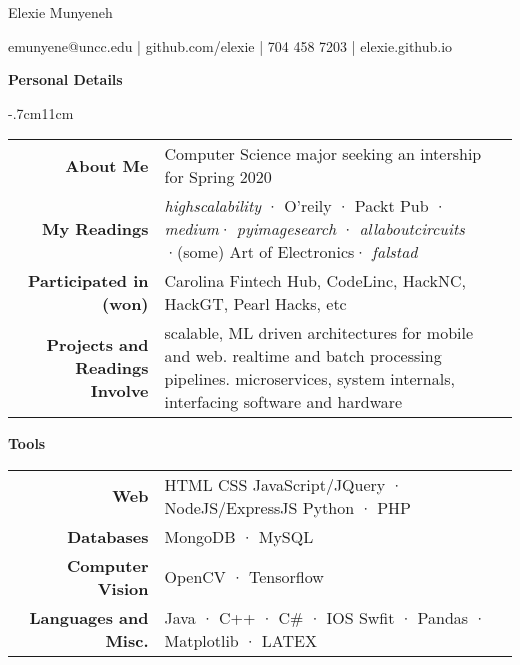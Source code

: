 \documentclass[12pt]{extarticle}
\begin{document}
\begin{center} 
 {\huge Elexie Munyeneh}
	\begin{center} 
		emunyene@uncc.edu |  github.com/elexie  | 704 458 7203 | elexie.github.io
	\end{center}
\end{center} 

	
\begin{flushleft}	
 \textbf{ Personal Details} %
 \end{flushleft}
 
\begin{flushleft}
\begin {adjustwidth}{-.7cm}{11cm}
\begin{tabularx}{\textwidth}{ r p{11cm} }
\small
   \textbf{About Me}     & Computer Science major seeking an intership for Spring 2020    \\ %
 \addlinespace[0.25cm]
 \small
   \textbf{My Readings }    & \emph{highscalability} · O'reily · Packt Pub · \emph{medium}· \emph{pyimagesearch} · \emph{allaboutcircuits} ·(some) Art of Electronics·  \emph{falstad} \\ 
      \addlinespace[0.25cm]
\small    
\textbf{Participated in  (won)}    & Carolina Fintech Hub, CodeLinc, HackNC, HackGT, Pearl Hacks, etc   \\ 
   \addlinespace[0.25cm]
  \small
 \textbf{Projects  and Readings Involve }         & scalable, ML driven architectures for mobile and web. realtime and batch processing pipelines. microservices, system internals, interfacing software and hardware         \\ %
 \end{tabularx}
 \end{adjustwidth}   	
\end{flushleft}	
 
 \begin{flushleft}
 \textbf{ Tools} %

 \begin{adjustwidth}{1.2cm}{-1cm}
\begin{tabularx}{\textwidth}{ r  p{11cm} }
\small
   \textbf{Web}     &  HTML CSS JavaScript/JQuery  · NodeJS/ExpressJS  Python · PHP      \\ %
   \addlinespace[0.25cm]
\small   
   \textbf{Databases}         & MongoDB · MySQL           \\ %
   \addlinespace[0.25cm]
\small   
   \textbf{Computer Vision}    & OpenCV ·  Tensorflow     \\ %
   \addlinespace[0.25cm]
\small   
  \textbf{Languages and Misc.}    & Java ·  C++ · C\# ·  IOS Swfit ·  Pandas  · Matplotlib · LATEX \\ %
   
 \end{tabularx}  	
 \end{adjustwidth} 
 \end{flushleft}
 
\end{document}
